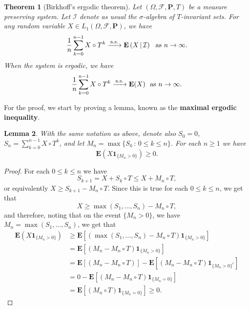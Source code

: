 \documentclass[12pt]{article}
\newtheorem{thm}{Theorem}[section]
\newtheorem{lem}[thm]{Lemma}
\newcommand{\prob}{\mathbf{P}}
\newcommand{\expec}{\mathbf{E}}
\newcommand{\condexp}[2]{\expec\left(#1\,|\,#2\right)}
\newcommand{\ind}{\textbf{1}}
\theoremstyle{example}
\begin{document}
\begin{thm}[Birkhoff's ergodic theorem] Let $(\Omega, \mathcal{F}, \prob, T)$ be a measure preserving system. Let $\mathcal{I}$ denote as usual the $\sigma$-algebra of $T$-invariant sets. For any random variable $X \in L_1(\Omega, \mathcal{F}, \prob)$, we have
\begin{equation} \label{eq:birkhoffergodic1}
\frac{1}{n} \sum_{k=0}^{n-1} X\circ T^k \xrightarrow[]{\textrm{\,a.s.\,}} \condexp{X}{\mathcal{I}}\ \textrm{ as }n\to\infty.
\end{equation}
When the system is ergodic, we have
\begin{equation} \label{eq:birkhoffergodic2}
\frac{1}{n} \sum_{k=0}^{n-1} X\circ T^k \xrightarrow[]{\textrm{\,a.s.\,}} \expec(X)\ \textrm{ as }n\to\infty.
\end{equation}
\end{thm}

For the proof, we start by proving a lemma, known as the \textbf{maximal ergodic inequality}.

\begin{lem} 
\label{lem-ergodic-maximal}
With the same notation as above, denote also $S_0=0$, $S_n  = \sum_{k=0}^{n-1} X\circ T^k$, and let $M_n=\max\{ S_k \,:\,0\le k\le n\}$. For each $n\ge1$ we have
$$
\expec(X \ind_{\{M_n > 0 \}}) \ge 0.
$$
\end{lem}

\begin{proof}
For each $0\le k\le n$ we have
$$ S_{k+1} = X + S_k\circ T \le X + M_n\circ T, $$
or equivalently $X \ge S_{k+1} - M_n\circ T$. Since this is true for each $0\le k\le n$, we get that $$ X \ge \max(S_1,\ldots,S_n)-M_n\circ T, $$
and therefore,
noting that on the event $\{M_n>0\}$, we have $M_n=\max(S_1,\ldots,S_n)$, we get that
\begin{align*}
\expec(X \ind_{\{M_n > 0 \}}) 
&\ge
\expec\left[(\max(S_1,\ldots,S_n) - M_n\circ T) \ind_{\{M_n > 0 \}}\right]
\\ &=
\expec\left[(M_n - M_n\circ T) \ind_{\{M_n > 0 \}}\right]
\\ &= 
\expec\left[(M_n - M_n\circ T)\right]
-
\expec\left[(M_n - M_n\circ T) \ind_{\{M_n > 0 \}^c}\right]
\\ &= 0 -
\expec\left[(M_n - M_n\circ T) \ind_{\{M_n = 0 \}}\right]
\\ &=
\expec\left[(M_n\circ T) \ind_{\{M_n = 0 \}}\right] \ge 0.
\end{align*}
\end{proof}
\end{document}
